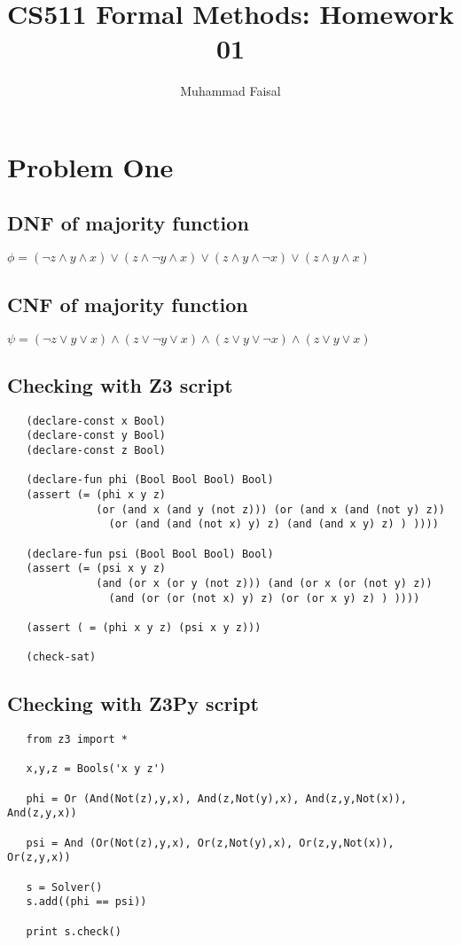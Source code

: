 \documentclass[11pt,leqno,fleqn]{article}
\title{CS511 Formal Methods: Homework 01}
\author{Muhammad Faisal}
\date{} %
\begin{document}
\maketitle


\section{Problem One}

\subsection{DNF of majority function}
$\phi = (\lnot z \land y \land x) \lor (z \land \lnot y \land x) \lor (z \land y \land \lnot x) \lor (z \land y \land x) $

\subsection{CNF of majority function}
$\psi = (\lnot z \lor y \lor x) \land (z \lor \lnot y \lor x) \land (z \lor y \lor \lnot x) \land (z \lor y \lor x) $

\subsection{Checking with Z3 script}

\begin{verbatim}
   (declare-const x Bool)
   (declare-const y Bool)
   (declare-const z Bool)
   
   (declare-fun phi (Bool Bool Bool) Bool)
   (assert (= (phi x y z)
              (or (and x (and y (not z))) (or (and x (and (not y) z))
                (or (and (and (not x) y) z) (and (and x y) z) ) ))))
   
   (declare-fun psi (Bool Bool Bool) Bool)
   (assert (= (psi x y z)
              (and (or x (or y (not z))) (and (or x (or (not y) z))
                (and (or (or (not x) y) z) (or (or x y) z) ) ))))
   
   (assert ( = (phi x y z) (psi x y z)))
   
   (check-sat)
\end{verbatim}


\subsection{Checking with Z3Py script}
\begin{verbatim}
   from z3 import *

   x,y,z = Bools('x y z')

   phi = Or (And(Not(z),y,x), And(z,Not(y),x), And(z,y,Not(x)), And(z,y,x))

   psi = And (Or(Not(z),y,x), Or(z,Not(y),x), Or(z,y,Not(x)), Or(z,y,x)) 

   s = Solver()
   s.add((phi == psi))

   print s.check()
\end{verbatim}
\end{document}
